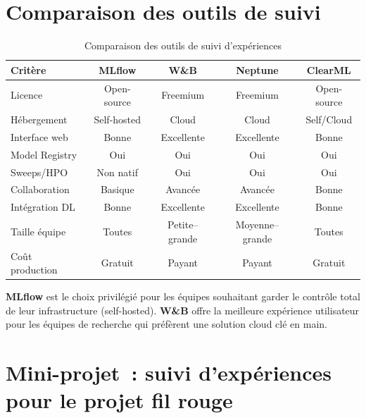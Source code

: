 \section{Comparaison des outils de suivi}
\label{sec:tracking-tools-comparison}


\begin{table}[htbp]
\centering
\caption{Comparaison des outils de suivi d'exp\'eriences}
\label{tab:tracking-tools}
\small
\begin{tabular}{lcccc}
\toprule
\textbf{Crit\`ere} & \textbf{MLflow} & \textbf{W\&B} & \textbf{Neptune} & \textbf{ClearML} \\
\midrule
Licence & Open-source & Freemium & Freemium & Open-source \\
H\'ebergement & Self-hosted & Cloud & Cloud & Self/Cloud \\
Interface web & Bonne & Excellente & Excellente & Bonne \\
Model Registry & Oui & Oui & Oui & Oui \\
Sweeps/HPO & Non natif & Oui & Oui & Oui \\
Collaboration & Basique & Avanc\'ee & Avanc\'ee & Bonne \\
Int\'egration DL & Bonne & Excellente & Excellente & Bonne \\
Taille \'equipe & Toutes & Petite--grande & Moyenne--grande & Toutes \\
Co\^ut production & Gratuit & Payant & Payant & Gratuit \\
\bottomrule
\end{tabular}
\end{table}

\begin{remarque}
\textbf{MLflow} est le choix privil\'egi\'e pour les \'equipes souhaitant garder
le contr\^ole total de leur infrastructure (self-hosted). \textbf{W\&B} offre
la meilleure exp\'erience utilisateur pour les \'equipes de recherche qui
pr\'ef\`erent une solution cloud cl\'e en main.
\end{remarque}

\section{Mini-projet~: suivi d'exp\'eriences pour le projet fil rouge}
\label{sec:miniprojet-tracking}

